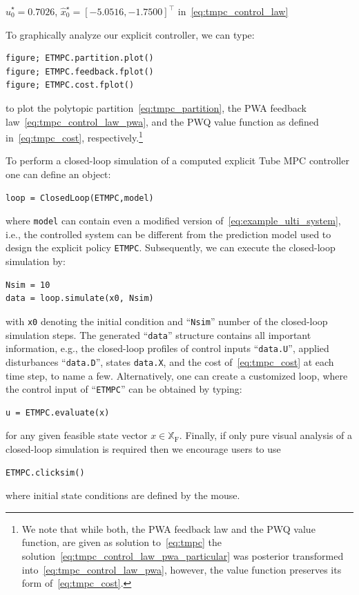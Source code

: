 \documentclass[letterpaper, 10 pt, conference]{ieeeconf}
\begin{document}
$\hat{u}_{0}^{\star} = 0.7026$, $\hat{x}_{0}^{\star} = [-5.0516, -1.7500]^{\top}$ in~\eqref{eq:tmpc_control_law}


To graphically analyze our explicit controller, we can type:
\begin{lstlisting}[style=Matlab-editor]
figure; ETMPC.partition.plot()
figure; ETMPC.feedback.fplot()
figure; ETMPC.cost.fplot()
\end{lstlisting}
to plot the polytopic partition~\eqref{eq:tmpc_partition}, the PWA feedback law~\eqref{eq:tmpc_control_law_pwa}, and the PWQ value function as defined in~\eqref{eq:tmpc_cost}, respectively.\footnote{We note that while both, the PWA feedback law and the PWQ value function, are given as solution to~\eqref{eq:tmpc} the solution~\eqref{eq:tmpc_control_law_pwa_particular} was posterior transformed into~\eqref{eq:tmpc_control_law_pwa}, however, the value function preserves its form of~\eqref{eq:tmpc_cost}.}

To perform a closed-loop simulation of a computed explicit Tube MPC controller one can define an object:
\begin{lstlisting}[style=Matlab-editor]
loop = ClosedLoop(ETMPC,model)
\end{lstlisting}
where \verb|model| can contain even a modified version of~\eqref{eq:example_ulti_system}, i.e., the controlled system can be different from the prediction model used to design the explicit policy \verb|ETMPC|. Subsequently, we can execute the closed-loop simulation by:
\begin{lstlisting}[style=Matlab-editor]
Nsim = 10
data = loop.simulate(x0, Nsim)
\end{lstlisting}	
with \verb|x0| denoting the initial condition and ``\verb|Nsim|'' number of the closed-loop simulation steps. The generated ``\verb|data|'' structure contains all important information, e.g., the closed-loop profiles of control inputs ``\verb|data.U|'', applied disturbances ``\verb|data.D|'', states \verb|data.X|, and the cost of~\eqref{eq:tmpc_cost} at each time step, to name a few.
Alternatively, one can create a customized loop, where the control input of ``\verb|ETMPC|'' can be obtained by typing: 
\begin{lstlisting}[style=Matlab-editor]
u = ETMPC.evaluate(x)
\end{lstlisting}
for any given feasible state vector $x\in\mathbb{X}_{\mathrm{F}}$.
%
Finally, if only pure visual analysis of a closed-loop simulation is required then we encourage users to use
\begin{lstlisting}[style=Matlab-editor]
ETMPC.clicksim()
\end{lstlisting}
where initial state conditions are defined by the mouse.
%
\end{document}
